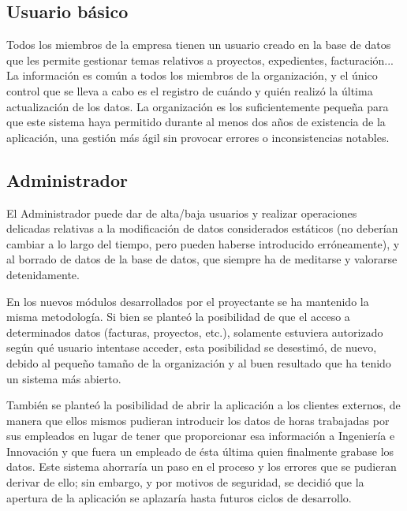 \subsection{Usuario básico}
\label{sec:usuario_basico}

Todos los miembros de la empresa tienen un usuario creado en la base de datos
que les permite gestionar temas relativos a proyectos, expedientes,
facturación... La información es común a todos los miembros de la organización,
y el único control que se lleva a cabo es el registro de cuándo y quién realizó
la última actualización de los datos. La organización es los suficientemente
pequeña para que este sistema haya permitido durante al menos dos años de
existencia de la aplicación, una gestión más ágil sin provocar errores o
inconsistencias notables.

\subsection{Administrador}
\label{sec:administrador}

El Administrador puede dar de alta/baja usuarios y realizar operaciones
delicadas relativas a la modificación de datos considerados estáticos (no
deberían cambiar a lo largo del tiempo, pero pueden haberse introducido
erróneamente), y al borrado de datos de la base de datos, que siempre ha de
meditarse y valorarse detenidamente.

En los nuevos módulos desarrollados por el proyectante se ha mantenido la
misma metodología. Si bien se planteó la posibilidad de que el acceso a
determinados datos (facturas, proyectos, etc.), solamente estuviera autorizado
según qué usuario intentase acceder, esta posibilidad se desestimó, de nuevo,
debido al pequeño tamaño de la organización y al buen resultado que ha tenido un
sistema más abierto.

También se planteó la posibilidad de abrir la aplicación a los clientes
externos, de manera que ellos mismos pudieran introducir los datos de horas
trabajadas por sus empleados en lugar de tener que proporcionar esa información
a Ingeniería e Innovación y que fuera un empleado de ésta última quien
finalmente grabase los datos. Este sistema ahorraría un paso en el proceso y
los errores que se pudieran derivar de ello; sin embargo, y por motivos de
seguridad, se decidió que la apertura de la aplicación se aplazaría hasta
futuros ciclos de desarrollo.